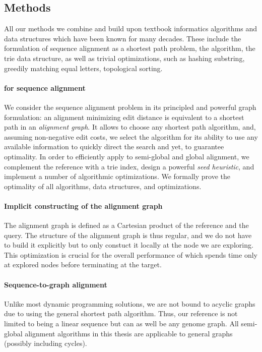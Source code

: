 \subsection*{Methods}

All our methods we combine and build upon textbook informatics algorithms and
data structures which have been known for many decades. These include the
formulation of sequence alignment as a shortest path problem, the \A algorithm,
the trie data structure, as well as trivial optimizations, such as hashing
substring, greedily matching equal letters, topological sorting.

\paragraph{\A for sequence alignment}
We consider the sequence alignment problem in its principled and powerful graph
formulation: an alignment minimizing edit distance is equivalent to a shortest
path in an \emph{alignment graph}. It allows to choose any shortest path
algorithm, and, assuming non-negative edit costs, we select the \A algorithm for
its ability to use any available information to quickly direct the search and
yet, to guarantee optimality. In order to efficiently apply \A to semi-global
and global alignment, we complement the reference with a trie index, design a
powerful \emph{seed heuristic}, and implement a number of algorithmic
optimizations. We formally prove the optimality of all algorithms, data
structures, and optimizations.

\paragraph{Implicit constructing of the alignment graph}
The alignment graph is defined as a Cartesian product of the reference and the
query. The structure of the alignment graph is thus regular, and we do not have
to build it explicitly but to only constuct it locally at the node we are
exploring. This optimization is crucial for the overall performance of \A which
spends time only at explored nodes before terminating at the target.

\paragraph{Sequence-to-graph alignment}
Unlike most dynamic programming solutions, we are not bound to acyclic graphs
due to using the general \A shortest path algorithm. Thus, our reference is not
limited to being a linear sequence but can as well be any genome graph. All
semi-global alignment algorithms in this thesis are applicable to general graphs
(possibly including cycles).

